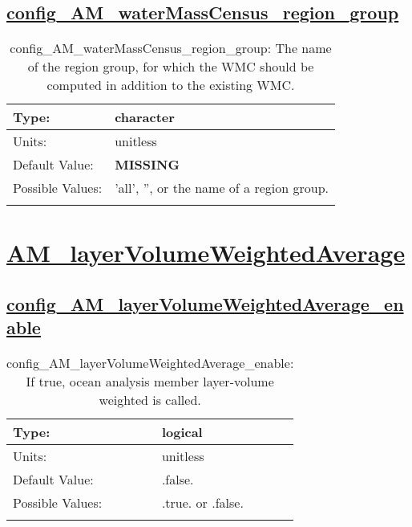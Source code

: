 \subsection[config\_AM\_waterMassCensus\_region\_group]{\hyperref[sec:nm_tab_AM_waterMassCensus]{config\_AM\_waterMassCensus\_region\_group}}
\label{subsec:nm_sec_config_AM_waterMassCensus_region_group}
\begin{center}
\begin{longtable}{| p{2.0in} || p{4.0in} |}
    \hline
    Type: & character \\
    \hline
    Units: & \si{unitless} \\
    \hline
    Default Value: & {\bf \color{red} MISSING} \\
    \hline
    Possible Values: & 'all', '', or the name of a region group. \\
    \hline
    \caption{config\_AM\_waterMassCensus\_region\_group: The name of the region group, for which the WMC should be computed in addition to the existing WMC.}
\end{longtable}
\end{center}
\section[AM\_layerVolumeWeightedAverage]{\hyperref[sec:nm_tab_AM_layerVolumeWeightedAverage]{AM\_layerVolumeWeightedAverage}}
\label{sec:nm_sec_AM_layerVolumeWeightedAverage}
\subsection[config\_AM\_layerVolumeWeightedAverage\_enable]{\hyperref[sec:nm_tab_AM_layerVolumeWeightedAverage]{config\_AM\_layerVolumeWeightedAverage\_enable}}
\label{subsec:nm_sec_config_AM_layerVolumeWeightedAverage_enable}
\begin{center}
\begin{longtable}{| p{2.0in} || p{4.0in} |}
    \hline
    Type: & logical \\
    \hline
    Units: & \si{unitless} \\
    \hline
    Default Value: & .false. \\
    \hline
    Possible Values: & .true. or .false. \\
    \hline
    \caption{config\_AM\_layerVolumeWeightedAverage\_enable: If true, ocean analysis member layer-volume weighted is called.}
\end{longtable}
\end{center}
